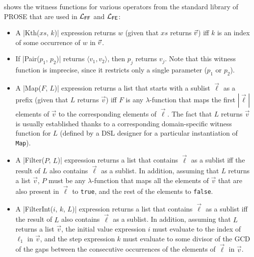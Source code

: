 \begin{example}
     shows the witness functions for various operators from the standard library of PROSE that are
    used in $\mathcal{L}_{\mathsf{FF}}$ and $\mathcal{L}_{\mathsf{FE}}$:
    \begin{itemize}[nosep]
        \item A \dslinline|Kth($xs$, $k$)| expression returns $w$ (given that $xs$ returns $\vec{v}$) iff $k$ is an
            index of some occurrence of $w$ in $\vec{v}$.
        \item If \dslinline|Pair($p_1$, $p_2$)| returns $\langle v_1, v_2\rangle$, then $p_j$ returns $v_j$.
            Note that this witness function is imprecise, since it restricts only a single parameter ($p_1$ or $p_2$).
        \item A \dslinline|Map($F$, $L$)| expression returns a list that starts with a sublist $\vec{\ell}$ as a prefix
            (given that $L$ returns $\vec{v}$) iff $F$ is any $\lambda$-function that maps the first $|\vec{\ell}|$
            elements of $\vec{v}$ to the corresponding elements of $\vec{\ell}$.
            The fact that $L$ returns $\vec{v}$ is usually established thanks to a corresponding domain-specific witness
            function for $L$ (defined by a DSL designer for a particular instantiation of \texttt{Map}).
        \item A \dslinline|Filter($P$, $L$)| expression returns a list that contains $\vec{\ell}$ as a sublist iff the
            result of $L$ also contains $\vec{\ell}$ as a sublist.
            In addition, assuming that $L$ returns a list $\vec{v}$, $P$ must be any $\lambda$-function that maps all
            the elements of $\vec{v}$ that are also present in $\vec{\ell}$ to \texttt{true}, and the rest of the
            elements to \texttt{false}.
        \item A \dslinline|FilterInt($i$, $k$, $L$)| expression returns a list that contains $\vec{\ell}$ as a sublist
            iff the result of $L$ also contains $\vec{\ell}$ as a sublist.
            In addition, assuming that $L$ returns a list $\vec{v}$, the initial value expression $i$ must evaluate to
            the index of $\ell_1$ in $\vec{v}$, and the step expression $k$ must evaluate to some divisor of the GCD of
            the gaps between the consecutive occurrences of the elements of $\vec{\ell}$ in $\vec{v}$.
    \end{itemize}
\end{example}

